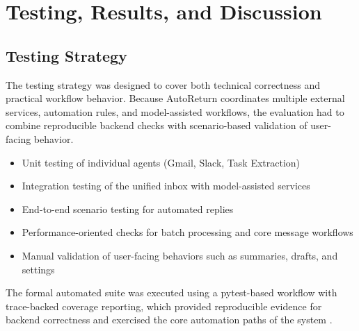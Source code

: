 \chapter{Testing, Results, and Discussion}
\label{sec:testing}


\section{Testing Strategy}
The testing strategy was designed to cover both technical correctness and practical workflow behavior. Because AutoReturn coordinates multiple external services, automation rules, and model-assisted workflows, the evaluation had to combine reproducible backend checks with scenario-based validation of user-facing behavior.

\begin{itemize}
    \item Unit testing of individual agents (Gmail, Slack, Task Extraction)
    \item Integration testing of the unified inbox with model-assisted services
    \item End-to-end scenario testing for automated replies
    \item Performance-oriented checks for batch processing and core message workflows
    \item Manual validation of user-facing behaviors such as summaries, drafts, and settings
\end{itemize}

The formal automated suite was executed using a pytest-based workflow with trace-backed coverage reporting, which provided reproducible evidence for backend correctness and exercised the core automation paths of the system \cite{pytest2024,pythontrace2024}.

